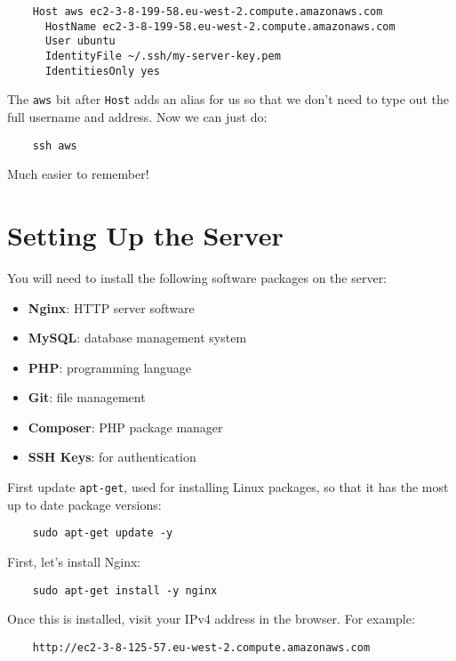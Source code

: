 \begin{verbatim}
    Host aws ec2-3-8-199-58.eu-west-2.compute.amazonaws.com
      HostName ec2-3-8-199-58.eu-west-2.compute.amazonaws.com
      User ubuntu
      IdentityFile ~/.ssh/my-server-key.pem
      IdentitiesOnly yes
\end{verbatim}

The \texttt{aws} bit after \texttt{Host} adds an alias for us so that we don't need to type out the full username and address. Now we can just do:

\begin{verbatim}
    ssh aws
\end{verbatim}

Much easier to remember!



\section{Setting Up the Server}

You will need to install the following software packages on the server:

\begin{itemize}
    \item \textbf{Nginx}: HTTP server software
    \item \textbf{MySQL}: database management system
    \item \textbf{PHP}: programming language
    \item \textbf{Git}: file management
    \item \textbf{Composer}: PHP package manager
    \item \textbf{SSH Keys}: for authentication
\end{itemize}

First update \texttt{apt-get}, used for installing Linux packages, so that it has the most up to date package versions:

\begin{verbatim}
    sudo apt-get update -y
\end{verbatim}

First, let's install Nginx:

\begin{verbatim}
    sudo apt-get install -y nginx
\end{verbatim}

Once this is installed, visit your IPv4 address in the browser. For example:

\begin{verbatim}
    http://ec2-3-8-125-57.eu-west-2.compute.amazonaws.com
\end{verbatim}

